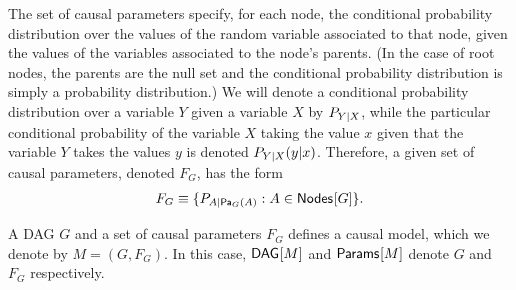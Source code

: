The set of causal parameters specify, for each node, the conditional probability distribution over the values of the random variable associated to that node, given the values of the variables associated to the node's parents.  (In the case of root nodes, the parents are the null set and the conditional probability distribution is simply a probability distribution.)
 We will denote a conditional probability distribution over a variable $Y$ given a variable $X$ by $\pfunc{Y|X}$, while the particular conditional probability of the variable $X$ taking the value $x$ given that the variable $Y$ takes the values $y$ is denoted $\pdf[Y|X]{y|x}$.  
Therefore, a given set of causal parameters, denoted $F_G$, has the form
\begin{align}
F_G \equiv \{ \pfunc{A|\Pa[G]{A}} : A \in \SmallNamedFunction{Nodes}{G} \}.
\end{align}

A DAG $G$ and a set of causal parameters $F_G$ defines a causal model, which we denote by $M = (G,F_G)$. In this case,
 $\SmallNamedFunction{DAG}{M}$ and $\SmallNamedFunction{Params}{M}$ denote $G$ and $F_G$ respectively.


